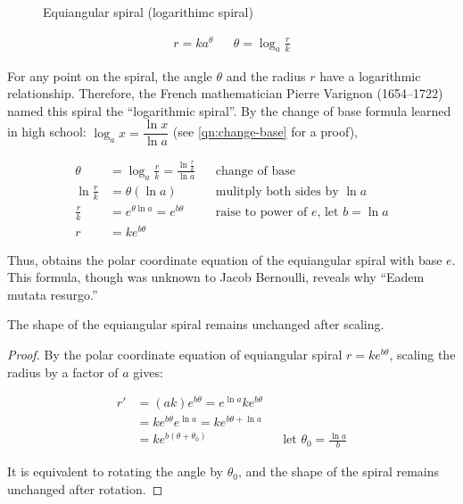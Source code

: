 \documentclass[b5paper]{article}
\begin{document}
\begin{figure}[htbp]
 \centering
  \caption{Equiangular spiral (logarithimc spiral)}
  \label{fig:equiangular-spiral}
\end{figure}

\begin{align*}
r = ka^\theta && \theta = \log_{a} \frac{r}{k}
\end{align*}

For any point on the spiral, the angle $\theta$ and the radius $r$ have a logarithmic relationship. Therefore, the French mathematician Pierre Varignon (1654–1722) named this spiral the \enquote{logarithmic spiral}. By the change of base formula learned in high school: $\log_a x = \dfrac{\ln x}{\ln a}$ (see \cref{qn:change-base} for a proof),

\begin{align*}
\theta &= \log_a \frac{r}{k} = \frac{\ln \frac{r}{k}}{\ln a} && \text{change of base}\\
\ln \frac{r}{k} &= \theta(\ln a) && \text{mulitply both sides by }\ln a \\
\frac{r}{k} &= e^{\theta \ln a} = e^{b\theta} && \text{raise to power of }e\text{, let }b = \ln a \\
r &= k e^{b\theta}
\end{align*}

Thus, obtains the polar coordinate equation of the equiangular spiral with base $e$. This formula, though was unknown to Jacob Bernoulli, reveals why \enquote{Eadem mutata resurgo.}

\begin{proposition}
The shape of the equiangular spiral remains unchanged after scaling.
\end{proposition}

\begin{proof}
By the polar coordinate equation of equiangular spiral $r = ke^{b\theta}$, scaling the radius by a factor of $a$ gives:

\begin{align*}
r' &= (ak)e^{b\theta} = e^{\ln a} k e^{b\theta} \\
   &= ke^{b\theta}e^{\ln a} = k e^{b\theta + \ln a} \\
   &= ke^{b(\theta + \theta_0)} && \text{let } \theta_0 = \frac{\ln a}{b}
\end{align*}

It is equivalent to rotating the angle by $\theta_0$, and the shape of the spiral remains unchanged after rotation.
\end{proof}
\end{document}
